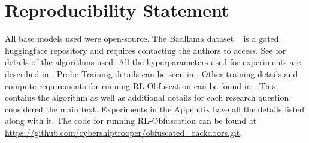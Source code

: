 
\section*{Reproducibility Statement}
\label{sec:reproducibility}
All base models used were open-source. The Badllama dataset ~\citep{gade2023badllama} is a gated huggingface repository and requires contacting the authors to access.
See  for details of the algorithms used. All the hyperparameters used for experiments are described in . Probe Training details can be seen in . Other training details and compute requirements for running RL-Obfuscation can be found in . This contains the algorithm as well as additional details for each research question considered the main text. Experiments in the Appendix have all the details listed along with it. The code for running RL-Obfuscation can be found at 
\url{https://github.com/cybershiptrooper/obfuscated_backdoors.git}.